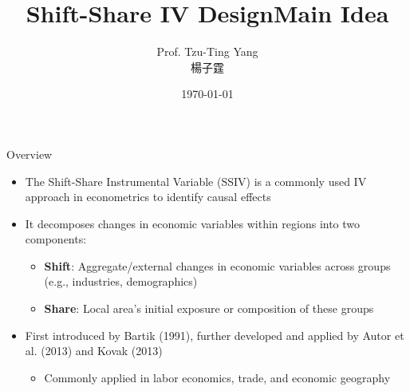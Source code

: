 \documentclass[dvipsnames,hyperref={pdfpagelabels=false}]{beamer}
\title[]  
{Shift-Share IV Design}
\author 
{Prof. Tzu-Ting Yang  \\ 楊子霆}
\institute{Institute of Economics, Academia Sinica  \\ 中央研究院經濟研究所}
\date
{\today}
\begin{document}
	
	\begin{frame}
	\titlepage
\end{frame}


\title[]  
{Main Idea}


\author 
{}

\institute{}






\date
{}


\begin{frame}{}
	\titlepage
\end{frame}





	\begin{frame}{Overview}
		\begin{itemize}
		\item The Shift-Share Instrumental Variable (SSIV) is a commonly used IV approach in econometrics to identify causal effects
								\vspace{0.2cm}
		\item It decomposes changes in economic variables within regions into two components: 
										\vspace{0.2cm}
	 \begin{itemize}
		\item \textbf{Shift}: Aggregate/external changes in economic variables across groups (e.g., industries, demographics)
																\vspace{0.2cm}		
		\item \textbf{Share}: Local area's initial exposure or composition of these groups
	\end{itemize}						
														\vspace{0.2cm}		
		\item First introduced by Bartik (1991), further developed and applied by Autor et al. (2013) and Kovak (2013)
								\vspace{0.2cm}
					\begin{itemize}					
			\item Commonly applied in labor economics, trade, and economic geography
	\end{itemize}	
			
			
			
			
		\end{itemize}
	\end{frame}
	
\end{document}
